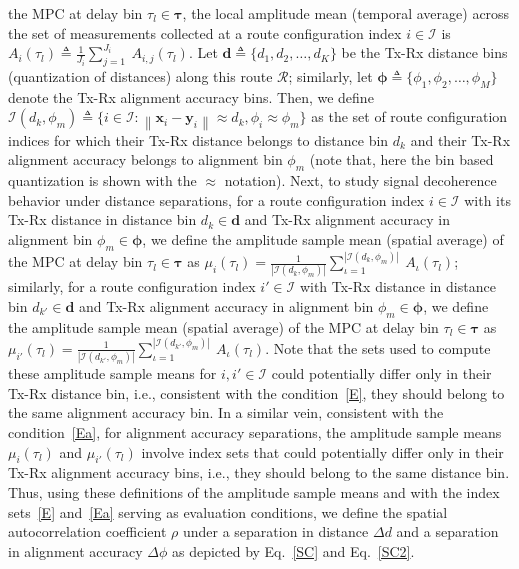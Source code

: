 \documentclass[10pt, twocolumn]{IEEEtran}
\newcommand{\norm}[1]{\left\lVert#1\right\rVert}
\begin{document}
{ the MPC at delay bin $\tau_{l}{\in}\boldsymbol{\tau}$, the local amplitude mean (temporal average) across the set of measurements collected at a route configuration index $i \in \mathcal{I}$ is $A_{i}(\tau_{l}) \triangleq \frac{1}{J_{i}}\sum_{j = 1}^{J_{i}}\ A_{i,j}(\tau_{l})$. Let $\mathbf{d}{\triangleq}\{d_{1},d_{2},{\dots},d_{K}\}$ be the Tx-Rx distance bins (quantization of distances) along this route $\mathcal{R}$; similarly, let $\boldsymbol{\phi}{\triangleq}\{\phi_{1},\phi_{2},{\dots},\phi_{M}\}$ denote the Tx-Rx alignment accuracy bins. Then, we define $\mathcal{I}(d_{k}, \phi_{m}) \triangleq \{i \in \mathcal{I}: \norm{\mathbf{x}_{i} - \mathbf{y}_{i}} \approx d_{k}, \phi_{i} \approx \phi_{m}\}$ as the set of route configuration indices for which their Tx-Rx distance belongs to distance bin $d_{k}$ and their Tx-Rx alignment accuracy belongs to alignment bin $\phi_{m}$ (note that, here the bin based quantization is shown with the $\approx$ notation). Next, to study signal decoherence behavior under distance separations, for a route configuration index $i \in \mathcal{I}$ with its Tx-Rx distance in distance bin $d_{k} \in \mathbf{d}$ and Tx-Rx alignment accuracy in alignment bin $\phi_{m} \in \boldsymbol{\phi}$, we define the amplitude sample mean (spatial average) of the MPC at delay bin $\tau_{l} \in \boldsymbol{\tau}$ as $\mu_{i}(\tau_{l}) = \frac{1}{|\mathcal{I}(d_{k}, \phi_{m})|}\sum_{\iota = 1}^{|\mathcal{I}(d_{k}, \phi_{m})|}\ A_{\iota}(\tau_{l})$; similarly, for a route configuration index $i'{\in}\mathcal{I}$ with Tx-Rx distance in distance bin $d_{k'} \in \mathbf{d}$ and Tx-Rx alignment accuracy in alignment bin $\phi_{m} \in \boldsymbol{\phi}$, we define the amplitude sample mean (spatial average) of the MPC at delay bin $\tau_{l} \in \boldsymbol{\tau}$ as $\mu_{i'}(\tau_{l}) = \frac{1}{|\mathcal{I}(d_{k'}, \phi_{m})|}\sum_{\iota = 1}^{|\mathcal{I}(d_{k'}, \phi_{m})|}\ A_{\iota}(\tau_{l})$. Note that the sets used to compute these amplitude sample means for $i, i' \in \mathcal{I}$ could potentially differ only in their Tx-Rx distance bin, i.e., consistent with the condition~\eqref{E}, they should belong to the same alignment accuracy bin. In a similar vein, consistent with the condition~\eqref{Ea}, for alignment accuracy separations, the amplitude sample means $\mu_{i}(\tau_{l})$ and $\mu_{i'}(\tau_{l})$ involve index sets that could potentially differ only in their Tx-Rx alignment accuracy bins, i.e., they should belong to the same distance bin. Thus, using these definitions of the amplitude sample means and with the index sets~\eqref{E} and~\eqref{Ea} serving as evaluation conditions, we define the spatial autocorrelation coefficient $\rho$ under a separation in distance $\Delta d$ and a separation in alignment accuracy $\Delta \phi$ as depicted by Eq.~\eqref{SC} and Eq.~\eqref{SC2}.\\
}
\end{document}
